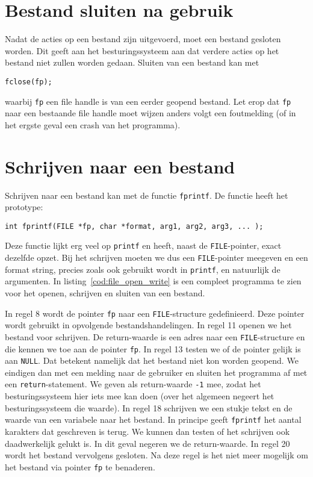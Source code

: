 \section{Bestand sluiten na gebruik}
Nadat de acties op een bestand zijn uitgevoerd, moet een bestand gesloten worden. Dit geeft aan het besturingssysteem aan dat verdere acties op het bestand niet zullen worden gedaan. Sluiten van een bestand kan met

\hspace*{1em}\texttt{fclose(fp);}

waarbij \texttt{fp} een file handle is van een eerder geopend bestand. Let erop dat \texttt{fp} naar een bestaande file handle moet wijzen anders volgt een foutmelding (of in het ergste geval een crash van het programma).


\section{Schrijven naar een bestand}
Schrijven naar een bestand kan met de functie \texttt{fprintf}. De functie heeft het prototype:

\hspace*{1em}\texttt{int fprintf(FILE *fp, char *format, arg1, arg2, arg3, ... );}

Deze functie lijkt erg veel op  \texttt{printf} en heeft, naast de \texttt{FILE}-pointer, exact dezelfde opzet. Bij het schrijven moeten we dus een \texttt{FILE}-pointer meegeven en een format string, precies zoals ook gebruikt wordt in \texttt{printf}, en natuurlijk de argumenten. In listing~\ref{cod:file_open_write} is een compleet programma te zien voor het openen, schrijven en sluiten van een bestand.


In regel 8 wordt de pointer \texttt{fp} naar een \texttt{FILE}-structure gedefinieerd. Deze pointer wordt gebruikt in opvolgende bestandshandelingen. In regel 11 openen we het bestand voor schrijven. De return-waarde is een adres naar een \texttt{FILE}-structure en die kennen we toe aan de pointer \texttt{fp}. In regel 13 testen we of de pointer gelijk is aan \texttt{NULL}. Dat betekent namelijk dat het bestand niet kon worden geopend. We eindigen dan met een melding naar de gebruiker en sluiten het programma af met een \texttt{return}-statement. We geven als return-waarde \texttt{-1} mee, zodat het besturingssysteem hier iets mee kan doen (over het algemeen negeert het besturingssysteem die waarde). In regel 18 schrijven we een stukje tekst en de waarde van een variabele naar het bestand. In principe geeft \texttt{fprintf} het aantal karakters dat geschreven is terug. We kunnen dan testen of het schrijven ook daadwerkelijk gelukt is. In dit geval negeren we de return-waarde. In regel 20 wordt het bestand vervolgens gesloten. Na deze regel is het niet meer mogelijk om het bestand via pointer \texttt{fp} te benaderen.

